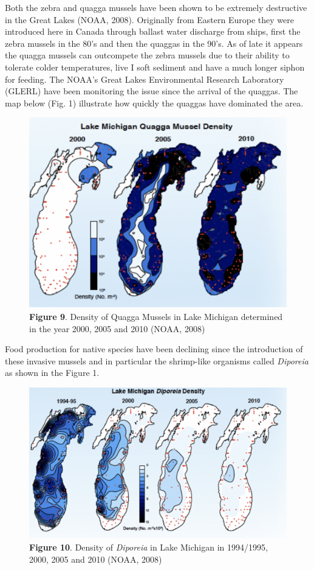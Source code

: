 \documentclass[
]{book}
\begin{document}
Both the zebra and quagga mussels have been shown to be extremely destructive in the Great Lakes (NOAA, 2008). Originally from Eastern Europe they were introduced here in Canada through ballast water discharge from ships, first the zebra mussels in the 80's and then the quaggas in the 90's. As of late it appears the quagga mussels can outcompete the zebra mussels due to their ability to tolerate colder temperatures, live I soft sediment and have a much longer siphon for feeding. The NOAA's Great Lakes Environmental Research Laboratory (GLERL) have been monitoring the issue since the arrival of the quaggas. The map below (Fig. 1) illustrate how quickly the quaggas have dominated the area.

\begin{figure}
\centering
\includegraphics{images/figure9.png}
\caption{\textbf{Figure 9}. Density of Quagga Mussels in Lake Michigan determined in the year 2000, 2005 and 2010 (NOAA, 2008)}
\end{figure}

Food production for native species have been declining since the introduction of these invasive mussels and in particular the shrimp-like organisms called \emph{Diporeia} as shown in the Figure 1.

\begin{figure}
\centering
\includegraphics{images/figure10.png}
\caption{\textbf{Figure 10}. Density of \emph{Diporeia} in Lake Michigan in 1994/1995, 2000, 2005 and 2010 (NOAA, 2008)}
\end{figure}
\end{document}

